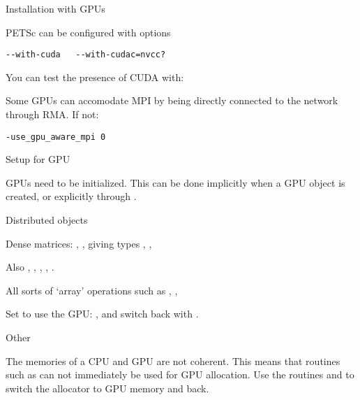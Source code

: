 
 {Installation with GPUs}

PETSc can be configured with options
\begin{verbatim}
--with-cuda   --with-cudac=nvcc?
\end{verbatim}
You can test the presence of CUDA with:


Some GPUs can accomodate MPI by being directly connected to the network
through  \ac{RMA}. If not:
\begin{verbatim}
-use_gpu_aware_mpi 0
\end{verbatim}

 {Setup for GPU}

GPUs need to be initialized.
This can be done implicitly when a GPU object is created,
or explicitly through .


 {Distributed objects}

Dense matrices:
,
,
giving types
,
,

Also
,
,
,
,
.

All sorts of `array' operations such as
,
,

Set  to use the GPU:
,
and switch back with
.

 {Other}
\label{sec:petsc-malloc-gpu}

The memories of a CPU and GPU are not coherent.
This means that routines such as 
can not immediately be used for GPU allocation.
Use the routines 
and 
to switch the allocator to GPU memory and back.


